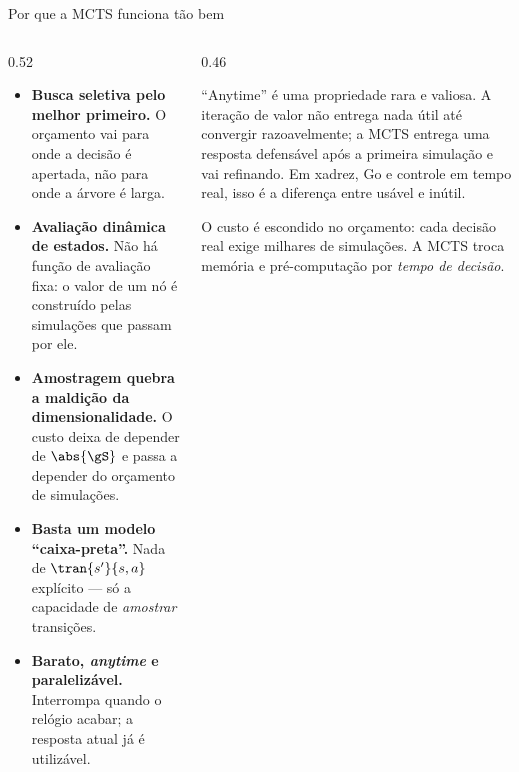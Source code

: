 \documentclass[aspectratio=169, 10pt]{beamer}
\begin{document}
\begin{frame}{Por que a MCTS funciona tão bem}
  \small
  \begin{columns}[T]
    \begin{column}{0.52\textwidth}
      \begin{itemize}\setlength{\itemsep}{0.4em}
        \item \textbf{Busca seletiva pelo melhor primeiro.} O orçamento vai para
              onde a decisão é apertada, não para onde a árvore é larga.
        \item \textbf{Avaliação dinâmica de estados.} Não há função de avaliação
              fixa: o valor de um nó é construído pelas simulações que passam por
              ele.
        \item \textbf{Amostragem quebra a maldição da dimensionalidade.} O custo
              deixa de depender de $\abs{\gS}$ e passa a depender do orçamento de
              simulações.
        \item \textbf{Basta um modelo ``caixa-preta''.} Nada de $\tran{s'}{s,a}$
              explícito — só a capacidade de \emph{amostrar} transições.
        \item \textbf{Barato, \emph{anytime} e paralelizável.} Interrompa quando o
              relógio acabar; a resposta atual já é utilizável.
      \end{itemize}
    \end{column}
    \begin{column}{0.46\textwidth}
      \begin{ideiabox}
        ``Anytime'' é uma propriedade rara e valiosa. A iteração de valor não
        entrega nada útil até convergir razoavelmente; a MCTS entrega uma resposta
        defensável após a primeira simulação e vai refinando. Em xadrez, Go e
        controle em tempo real, isso é a diferença entre usável e inútil.
      \end{ideiabox}
      \begin{alertabox}
        O custo é escondido no orçamento: cada decisão real exige milhares de
        simulações. A MCTS troca memória e pré-computação por \emph{tempo de
        decisão}.
      \end{alertabox}
    \end{column}
  \end{columns}
\end{frame}
\end{document}
